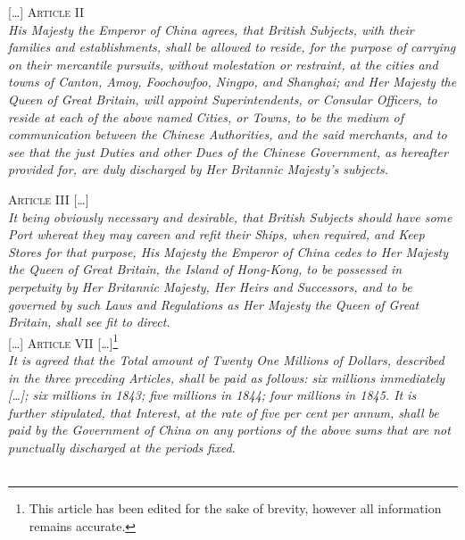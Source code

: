 \textrule
\vspace{0.6em}
{\centering \textsc{[\ldots] Article II} \\[1em]}
\textit{His Majesty the Emperor of China agrees, that British Subjects, with their families and establishments, shall be allowed to reside, for the purpose of carrying on their mercantile pursuits, without molestation or restraint, at the cities and towns of Canton, Amoy, Foochowfoo, Ningpo, and Shanghai; and Her Majesty the Queen of Great Britain, will appoint Superintendents, or Consular Officers, to reside at each of the above named Cities, or Towns, to be the medium of communication between the Chinese Authorities, and the said merchants, and to see that the just Duties and other Dues of the Chinese Government, as hereafter provided for, are duly discharged by Her Britannic Majesty's subjects.}

{\centering \textsc{Article III [\ldots]} \\[1em]}
\textit{It being obviously necessary and desirable, that British Subjects should have some Port whereat they may careen and refit their Ships, when required, and Keep Stores for that purpose, His Majesty the Emperor of China cedes to Her Majesty the Queen of Great Britain, the Island of Hong-Kong, to be possessed in perpetuity by Her Britannic Majesty, Her Heirs and Successors, and to be governed by such Laws and Regulations as Her Majesty the Queen of Great Britain, shall see fit to direct.} \\

{\centering \textsc{[\ldots] Article VII [\ldots]}\footnote{This article has been edited for the sake of brevity, however all information remains accurate.} \\[1em]}
\textit{It is agreed that the Total amount of Twenty One Millions of Dollars, described in the three preceding Articles, shall be paid as follows: six millions immediately \emph{[\ldots]}; six millions in 1843; five millions in 1844; four millions in 1845. It is further stipulated, that Interest, at the rate of five per cent per annum, shall be paid by the Government of China on any portions of the above sums that are not punctually discharged at the periods fixed.} \\
\textrule \\

